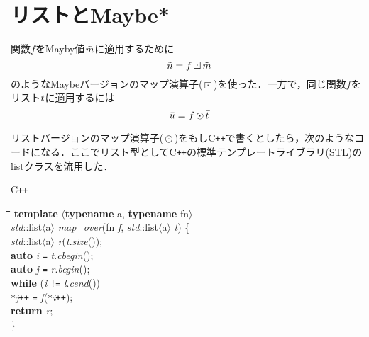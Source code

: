 \documentclass[twocolumn]{jsbook}
\newcommand{\cxx}{\textrm{C}\texttt{++}}
\newenvironment{cxxcode}{\begin{itembox}[r]{\cxx}}{\end{itembox}}
\newenvironment{python}{\begin{tabbing}\hspace*{1em}\=\hspace*{1em}\=\hspace*{1em}\=\hspace*{1em}\=\kill}{\end{tabbing}}
\newcommand{\pthnClassname}[1]{\textrm{#1}}
\newcommand{\pthnId}[1]{\textit{#1}}
\newcommand{\pthnKeyword}[1]{\textbf{#1}}
\newcommand{\pthnOp}[1]{\texttt{#1}}
\DeclareMathOperator{\hsklMap}{\odot}
\DeclareMathOperator{\hsklMaybeMap}{\boxdot}
\newcommand{\hsklList}[1]{\Bar{#1}}
\newcommand{\hsklMaybe}[1]{\Tilde{#1}}
\begin{document}

\section{リストとMaybe*}

関数$f$をMayby値$\hsklMaybe{m}$に適用するために$$\hsklMaybe{n}=f\hsklMaybeMap\hsklMaybe{m}$$のようなMaybeバージョンのマップ演算子($\hsklMaybeMap$)を使った．一方で，同じ関数$f$をリスト$\hsklList{t}$に適用するには$$\hsklList{u}=f\hsklMap\hsklList{t}$$

リストバージョンのマップ演算子($\hsklMap$)をもし\cxx で書くとしたら，次のようなコードになる．ここでリスト型として\cxx の標準テンプレートライブラリ(STL)の\pthnClassname{list}クラスを流用した．
\begin{cxxcode}
\begin{python}
\pthnKeyword{template} $\langle$\pthnKeyword{typename} \pthnClassname{a}, \pthnKeyword{typename} \pthnClassname{fn}$\rangle$\\
\pthnId{std}::\pthnClassname{list}$\langle$\pthnClassname{a}$\rangle$ \pthnId{map\_over}(\pthnClassname{fn} \pthnId{f}, \pthnId{std}::\pthnClassname{list}$\langle$\pthnClassname{a}$\rangle$ \pthnId{t}) \{\\
\>\pthnId{std}::\pthnClassname{list}$\langle$\pthnClassname{a}$\rangle$ \pthnId{r}(\pthnId{t}.\pthnId{size}());\\
\>\pthnKeyword{auto} \pthnId{i} \pthnOp{=} \pthnId{t}.\pthnId{cbegin}();\\
\>\pthnKeyword{auto} \pthnId{j} \pthnOp{=} \pthnId{r}.\pthnId{begin}();\\
\>\pthnKeyword{while} (\pthnId{i} \pthnOp{!=} \pthnId{l}.\pthnId{cend}())\\
\>\>\pthnOp{*}\pthnId{j}\pthnOp{++} \pthnOp{=} \pthnId{f}(\pthnOp{*}\pthnId{i}\pthnOp{++});\\
\>\pthnKeyword{return} \pthnId{r};\\
\}
\end{python}
\end{cxxcode}
\end{document}
